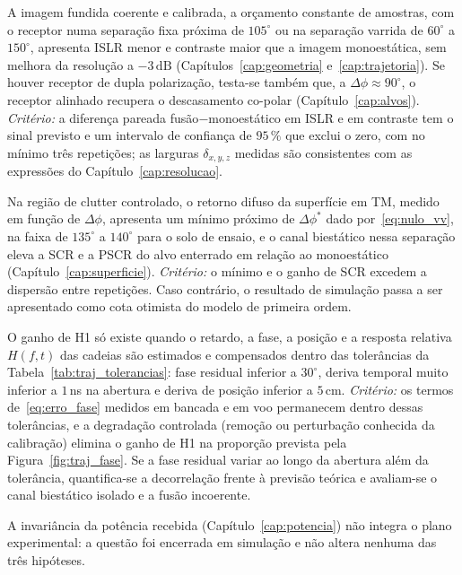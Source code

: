 \documentclass[12pt,a4paper,oneside]{book}
\theoremstyle{remark}
\newcommand{\dB}{\,\mathrm{dB}}
\theoremstyle{plain}
\theoremstyle{definition}
\begin{document}
\begin{description}[leftmargin=0pt]
  \item[H1 --- Imageamento.] A imagem fundida coerente e calibrada, a orçamento
  constante de amostras, com o receptor numa separação fixa próxima de
  $105^\circ$ ou na separação varrida de $60^\circ$ a $150^\circ$, apresenta ISLR
  menor e contraste maior que a imagem monoestática, sem melhora da resolução a
  $-3\dB$ (Capítulos~\ref{cap:geometria} e~\ref{cap:trajetoria}). Se houver
  receptor de dupla polarização, testa-se também que, a
  $\Delta\phi\approx90^\circ$, o receptor alinhado recupera o descasamento
  co-polar (Capítulo~\ref{cap:alvos}). \emph{Critério:} a diferença pareada
  fusão$-$monoestático em ISLR e em contraste tem o sinal previsto e um
  intervalo de confiança de $95\,\%$ que exclui o zero, com no mínimo três
  repetições; as larguras $\delta_{x,y,z}$ medidas são consistentes com as
  expressões do Capítulo~\ref{cap:resolucao}.
  \item[H2 --- Clutter.] Na região de clutter controlado, o retorno difuso da
  superfície em TM, medido em função de $\Delta\phi$, apresenta um mínimo
  próximo de $\Delta\phi^\ast$ dado por~\eqref{eq:nulo_vv}, na faixa de
  $135^\circ$ a $140^\circ$ para o solo de ensaio, e o canal biestático nessa
  separação eleva a SCR e a PSCR do alvo enterrado em relação ao monoestático
  (Capítulo~\ref{cap:superficie}). \emph{Critério:} o mínimo e o ganho de SCR
  excedem a dispersão entre repetições. Caso contrário, o resultado de
  simulação passa a ser apresentado como cota otimista do modelo de primeira
  ordem.
  \item[H3 --- Coerência.] O ganho de H1 só existe quando o retardo, a fase, a
  posição e a resposta relativa $H(f,t)$ das cadeias são estimados e
  compensados dentro das tolerâncias da Tabela~\ref{tab:traj_tolerancias}: fase
  residual inferior a $30^\circ$, deriva temporal muito inferior a $1\,$ns na
  abertura e deriva de posição inferior a $5\,$cm.
  \emph{Critério:} os termos de~\eqref{eq:erro_fase} medidos em bancada e em voo
  permanecem dentro dessas tolerâncias, e a degradação controlada (remoção ou
  perturbação conhecida da calibração) elimina o ganho de H1 na proporção
  prevista pela Figura~\ref{fig:traj_fase}. Se a fase residual variar ao longo
  da abertura além da tolerância, quantifica-se a decorrelação frente à previsão
  teórica e avaliam-se o canal biestático isolado e a fusão incoerente.
\end{description}

A invariância da potência recebida (Capítulo~\ref{cap:potencia}) não integra o
plano experimental: a questão foi encerrada em simulação e não altera nenhuma
das três hipóteses.
\end{document}
